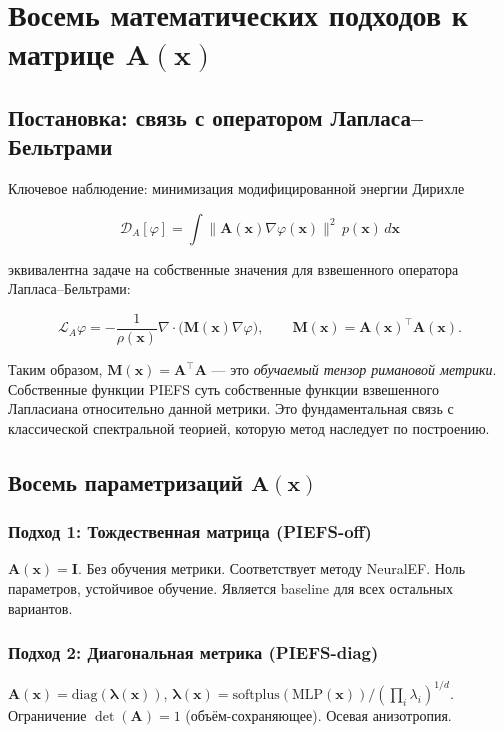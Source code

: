 \documentclass[14pt, a4paper, oneside]{extreport}
\theoremstyle{plain}
\theoremstyle{definition}
\begin{document}
\chapter{Восемь математических подходов к матрице $\mathbf{A}(\mathbf{x})$}
\label{app:math_approaches}

\section{Постановка: связь с оператором Лапласа--Бельтрами}

Ключевое наблюдение: минимизация модифицированной энергии Дирихле

\[
  \mathcal{D}_A[\varphi] = \int \|\mathbf{A}(\mathbf{x})\nabla\varphi(\mathbf{x})\|^2 \, p(\mathbf{x}) \, d\mathbf{x}
\]

эквивалентна задаче на собственные значения для взвешенного оператора Лапласа--Бельтрами:

\[
  \mathcal{L}_A \varphi = -\frac{1}{\rho(\mathbf{x})} \nabla \cdot \bigl(\mathbf{M}(\mathbf{x}) \nabla\varphi\bigr), \qquad
  \mathbf{M}(\mathbf{x}) = \mathbf{A}(\mathbf{x})^\top \mathbf{A}(\mathbf{x}).
\]

Таким образом, $\mathbf{M}(\mathbf{x}) = \mathbf{A}^\top\mathbf{A}$ — это \emph{обучаемый тензор римановой метрики}.
Собственные функции PIEFS суть собственные функции взвешенного Лапласиана относительно данной метрики.
Это фундаментальная связь с классической спектральной теорией, которую метод наследует по построению.

\section{Восемь параметризаций $\mathbf{A}(\mathbf{x})$}

\subsection{Подход 1: Тождественная матрица (PIEFS-off)}
$\mathbf{A}(\mathbf{x}) = \mathbf{I}$. Без обучения метрики. Соответствует методу NeuralEF.
Ноль параметров, устойчивое обучение. Является baseline для всех остальных вариантов.

\subsection{Подход 2: Диагональная метрика (PIEFS-diag)}
$\mathbf{A}(\mathbf{x}) = \mathrm{diag}(\boldsymbol{\lambda}(\mathbf{x}))$, $\boldsymbol{\lambda}(\mathbf{x}) = \mathrm{softplus}(\mathrm{MLP}(\mathbf{x})) / (\prod_i \lambda_i)^{1/d}$.
Ограничение $\det(\mathbf{A}) = 1$ (объём-сохраняющее). Осевая анизотропия.
\end{document}
